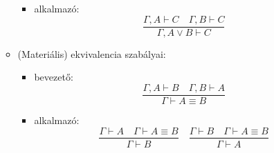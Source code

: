 \begin{definition}
\begin{itemize}
\begin{multicols}{2}
\begin{itemize}
\begin{itemize}
			\item alkalmazó:$$\frac{\Gamma,A\vdash C\quad \Gamma,B\vdash C}{\Gamma,A\lor B\vdash C}$$
		\end{itemize}
		\item (Materiális) ekvivalencia szabályai:
		\begin{itemize}
			\item bevezető:$$\frac{\Gamma,A\vdash B\quad \Gamma,B\vdash A}{\Gamma\vdash A\equiv B}$$
			\item alkalmazó:$$\frac{\Gamma\vdash A\quad \Gamma\vdash A\equiv B}{\Gamma\vdash B }\quad \frac{\Gamma\vdash B\quad \Gamma\vdash A \equiv B}{\Gamma\vdash A}$$
		\end{itemize}
	\end{itemize}
	\end{multicols}
\end{itemize}
\end{definition}
